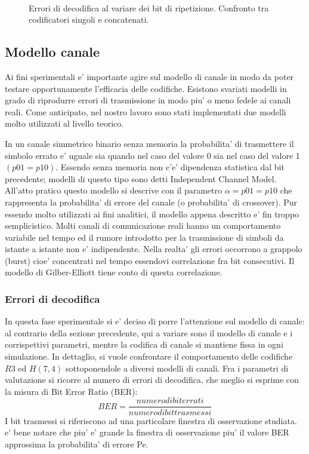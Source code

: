 \documentclass[a4paper,11pt]{article}
\theoremstyle{definition}
\begin{document}
\begin{figure}
	\centering
	\subfloat[][\emph{Modello canale: Simmetrico Binario ($\alpha=0.1$).} \label{fig:c1}]	{\texttt{[image: g3]}} \\
	\subfloat[][\emph{Modello canale: Simmetrico Binario ($\alpha=0.6$).} \label{fig:c2}]	{\texttt{[image: g4]}}
	\caption{Errori di decodifica al variare dei bit di ripetizione. Confronto tra codificatori singoli e concatenati.}
	\label{fig:confrontoconcat}
\end{figure}

\subsection{Modello canale}
Ai fini sperimentali e' importante agire sul modello di canale in modo da poter testare opportunamente l'efficacia delle codifiche. Esistono svariati modelli in grado di riprodurre errori di trasmissione in modo piu' o meno fedele ai canali reali. Come anticipato, nel nostro lavoro sono stati implementati due modelli molto utilizzati al livello teorico.

In un canale simmetrico binario senza memoria la probabilita' di trasmettere il simbolo errato e' uguale sia quando nel caso del valore 0 sia nel caso del valore 1 $(p01=p10)$. Essendo senza memoria non c'e' dipendenza statistica dal bit precedente; modelli di questo tipo sono detti Independent Channel Model. All'atto pratico questo modello si descrive con il parametro $\alpha=p01=p10$ che rappresenta la probabilita' di errore del canale (o probabilita' di crossover). Pur essendo molto utilizzati ai fini analitici, il modello appena descritto e' fin troppo semplicistico. Molti canali di comunicazione reali hanno un comportamento variabile nel tempo ed il rumore introdotto per la trasmissione di simboli da istante a istante non e' indipendente. Nella realta' gli errori occorrono a grappolo (burst) cioe' concentrati nel tempo essendovi correlazione fra bit consecutivi. Il modello di Gilber-Elliott tiene conto di questa correlazione.


\subsubsection{Errori di decodifica}
In questa fase sperimentale si e' deciso di porre l'attenzione sul modello di canale: al contrario della sezione precedente, qui a variare sono il modello di canale e i corrispettivi parametri, mentre la codifica di canale si mantiene fissa in ogni simulazione.
In dettaglio, si vuole confrontare il comportamento delle codifiche $R3$ ed $H(7,4)$ sottoponendole a diversi modelli di canali.  Fra i parametri di valutazione si ricorre al numero di errori di decodifica, che meglio si esprime con la misura di Bit Error Ratio (BER):
\[BER=\frac{numero di bit errati}{numero di bit trasmessi}\]
I bit trasmessi si riferiscono ad una particolare finestra di osservazione studiata. e' bene notare che piu' e' grande la finestra di osservazione piu' il valore BER approssima la probabilita' di errore Pe.
\end{document}

